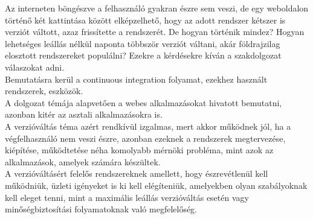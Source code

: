 Az interneten böngészve a felhasználó gyakran észre sem veszi, de egy weboldalon történő két kattintása között elképzelhető, hogy az adott rendszer kétszer is verziót váltott, azaz frissítette a rendszerét. De hogyan történik mindez? Hogyan lehetséges leállás nélkül naponta többször verziót váltani, akár földrajzilag elosztott rendszereket populálni? Ezekre a kérdésekre kíván a szakdolgozat válaszokat adni.
\\
Bemutatásra kerül a continuous integration folyamat, ezekhez használt rendszerek, eszközök.
\\
A dolgozat témája alapvetően a webes alkalmazásokat hivatott bemutatni, azonban kitér az asztali alkalmazásokra is.
\\
A verzióváltás téma azért rendkívül izgalmas, mert akkor működnek jól, ha a végfelhasználó nem veszi észre, azonban ezeknek a rendszerek megtervezése, kiépítése, működtetése néha komolyabb mérnöki probléma, mint azok az alkalmazások, amelyek számára készültek.\\
A verzióváltásért felelős rendszereknek amellett, hogy észrevétlenül kell működniük, üzleti igényeket is ki kell elégíteniük, amelyekben olyan szabályoknak kell eleget tenni, mint a maximális leállás verzióváltás esetén vagy minőségbiztosítási folyamatoknak való megfelelőség.
